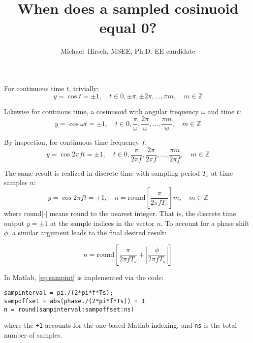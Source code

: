 \documentclass[12pt,a4paper]{article}
\author{Michael~Hirsch, MSEE,  Ph.D. EE candidate }
\title{When does a sampled cosinuoid equal 0?}
\begin{document}
\maketitle

For continuous time $t$, trivially:
\[
y = \cos{t} = \pm 1, \quad t\in 0,\pm \pi, \pm 2\pi,\ldots, \pi m, \quad m\in \mathbb{Z}
\]

Likewise for continous time, a cosinusoid with angular frequency $\omega$ and time $t$:
\[
y = \cos{\omega t} = \pm 1, \quad t\in 0,\frac{\pi}{\omega},\frac{2\pi}{\omega},\ldots, \frac{\pi m}{w}, \quad m\in \mathbb{Z}
\]

By inspection, for continuous time frequency $f$:
\[
y = \cos{2\pi f t} = \pm 1, \quad t\in 0,\frac{\pi}{2 \pi f},\frac{2\pi}{2\pi f},\ldots, \frac{\pi m}{2 \pi f}, \quad m\in \mathbb{Z}
\]


The same result is realized in discrete time with sampling period $T_s$ at time samples $n$:
\[
y = \cos{2\pi f t} = \pm 1, \quad n = \textrm{round}\left[\frac{\pi}{2\pi f T_s}\right] m, \quad m\in \mathbb{Z}
\]
where round[$\cdot$] means round to the nearest integer.
That is, the discrete time output $y=\pm 1$ at the sample indices in the vector $n$.
To account for a phase shift $\phi$, a similar argument leads to the final desired result:

\begin{equation}\label{eq:sampint}
n = \textrm{round}\left[\frac{\pi}{2\pi f T_s} + \left|\frac{\phi}{2\pi f T_s}\right|\right]
\end{equation}

In Matlab, \eqref{eq:sampint} is implemented via the code:

\begin{verbatim}
sampinterval = pi./(2*pi*f*Ts);
sampoffset = abs(phase./(2*pi*f*Ts)) + 1 
n = round(sampinterval:sampoffset:ns)
\end{verbatim}
where the \texttt{+1} accounts for the one-based Matlab indexing, and \texttt{ns} is the total number of samples.
\end{document}
